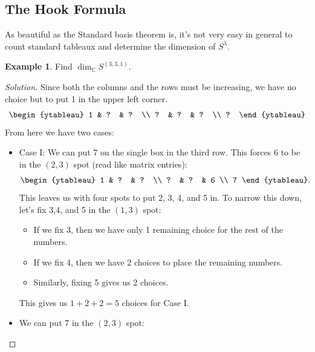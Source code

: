 \documentclass[12pt]{article}
\newcommand{\cx}{\mathbb{C}}
\theoremstyle{definition}
\newtheorem{example}{Example}[section]
\begin{document}
\subsection{The Hook Formula}
As beautiful as the Standard basis theorem is, it's not very easy in general to count standard tableaux and determine the dimension of $S^{\lambda}$.
\begin{example}
    Find $\dim_{\cx} S^{(3,3,1)}$.
    \begin{proof}[Solution]
        Since both the columns and the rows must be increasing, we have no choice but to put 1 in the upper left corner. 
        \begin{equation*}
            \begin{ytableau}
                1 & ?  & ?  \\
                ?  & ?  & ?  \\
                ?
            \end{ytableau}
        \end{equation*}
        From here we have two cases:
        \begin{itemize}
            \item Case I: We can put 7 on the single box in the third row. This forces 6 to be in the $(2,3)$ spot (read like matrix entries):
            \begin{equation*}
                \begin{ytableau}
                    1 & ?  & ?  \\
                    ?  & ?  & 6  \\
                    7
                \end{ytableau}.
            \end{equation*}
            This leaves us with four spots to put 2, 3, 4, and 5 in. To narrow this down, let's fix 3,4, and 5 in the $(1,3)$ spot:
            \begin{itemize}
                \item If we fix 3, then we have only 1 remaining choice for the rest of the numbers.
                \item If we fix 4, then we have 2 choices to place the remaining numbers.
                \item Similarly, fixing 5 gives us 2 choices.
            \end{itemize}
            This gives us $1 + 2 + 2 = 5$ choices for Case I.
            \item We can put 7 in the $(2,3)$ spot:
            \begin{equation*}

\end{equation*}
\end{itemize}
\end{proof}
\end{example}
\end{document}
